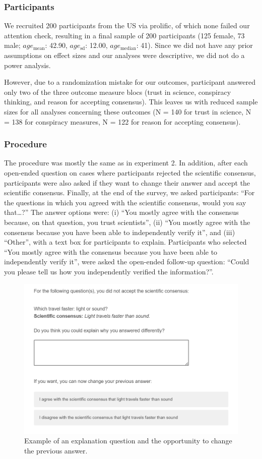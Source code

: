 \documentclass[
  doc,floatsintext]{apa6}
\begin{document}
\subsubsection{Participants}\label{participants-2}

We recruited 200 participants from the US via prolific, of which none failed our attention check, resulting in a final sample of 200 participants (125 female, 73 male; \(age_\text{mean}\): 42.90, \(age_\text{sd}\): 12.00, \(age_\text{median}\): 41). Since we did not have any prior assumptions on effect sizes and our analyses were descriptive, we did not do a power analysis.

However, due to a randomization mistake for our outcomes, participant answered only two of the three outcome measure blocs (trust in science, conspiracy thinking, and reason for accepting consensus). This leaves us with reduced sample sizes for all analyses concerning these outcomes (N = 140 for trust in science, N = 138 for conspiracy measures, N = 122 for reason for accepting consensus).

\subsubsection{Procedure}\label{procedure-2}

The procedure was mostly the same as in experiment 2. In addition, after each open-ended question on cases where participants rejected the scientific consensus, participants were also asked if they want to change their answer and accept the scientific consensus. Finally, at the end of the survey, we asked participants: ``For the questions in which you agreed with the scientific consensus, would you say that\ldots?'' The answer options were: (i) ``You mostly agree with the consensus because, on that question, you trust scientists'', (ii) ``You mostly agree with the consensus because you have been able to independently verify it'', and (iii) ``Other'', with a text box for participants to explain. Participants who selected ``You mostly agree with the consensus because you have been able to independently verify it'', were asked the open-ended follow-up question: ``Could you please tell us how you independently verified the information?''.



\begin{figure}

{\centering \includegraphics[width=0.5\linewidth]{figures/study3_example_explanation} 

}

\caption{Example of an explanation question and the opportunity to change the previous answer.}\label{fig:exp3-explanation-example}
\end{figure}
\end{document}
